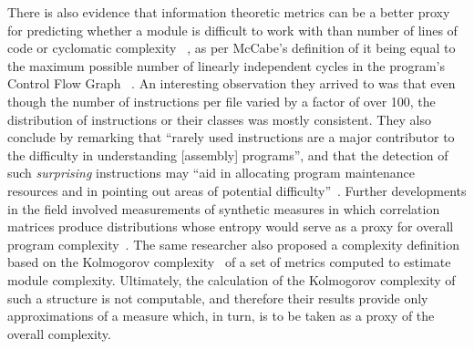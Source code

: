 \documentclass[10pt,conference]{IEEEtran}
\begin{document}
There is also evidence that information theoretic metrics can be a better proxy for predicting whether a module is difficult to work with than number of lines of code or cyclomatic complexity ~\cite{cook1993information}, as per McCabe's definition of it being equal to the maximum possible number of linearly independent cycles in the program's Control Flow Graph ~\cite{mccabe1976complexity}. An interesting observation they arrived to was that even though the number of instructions per file varied by a factor of over 100, the distribution of instructions or their classes was mostly consistent. They also conclude by remarking that ``rarely used instructions are a major contributor to the difficulty in understanding [assembly] programs'', and that the detection of such \textit{surprising} instructions may ``aid in allocating program maintenance resources and in pointing out areas of potential difficulty''~\cite{cook1993information}. Further developments in the field involved measurements of synthetic measures in which correlation matrices produce distributions whose entropy would serve as a proxy for overall program complexity~\cite{khoshgoftaar1992measure}. The same researcher also proposed a complexity definition based on the Kolmogorov complexity~\cite{kolmogorov1965three} of a set of metrics computed to estimate module complexity. Ultimately, the calculation of the Kolmogorov complexity of such a structure is not computable, and therefore their results provide only approximations of a measure which, in turn, is to be taken as a proxy of the overall complexity.
\end{document}
